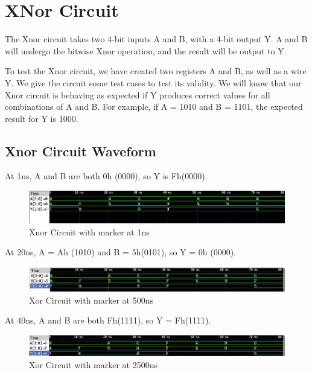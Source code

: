 \documentclass[12pt]{article}
\begin{document}
 \section{XNor Circuit}
 The Xnor circuit takes two 4-bit inputs A and B, with a 4-bit output Y. A and B will undergo the bitwise Xnor operation, and the result will be output to Y.
  
 
 To test the Xnor circuit, we have created two registers A and B, as well as a wire Y. We give the circuit some test cases to test its validity. We will know that our Xnor circuit is behaving as expected if Y produces correct values for all combinations of A and B. For example, if A = 1010 and B = 1101, the expected result for Y is 1000.
 
 
 \subsection{Xnor Circuit Waveform} 
 
 At 1ns, A and B are both 0h (0000), so Y is Fh(0000).
 \begin{figure}[H]
  \centering
  \includegraphics[width = 1.0\textwidth]{Xnor/XNOR-0ns.png}
  \caption{Xnor Circuit with marker at 1ns}
  \label{fig:enter-label} 
 \end{figure} 
 
 At 20ns, A = Ah (1010) and B = 5h(0101), so Y = 0h (0000).
  \begin{figure}[H]
  \centering 
 \includegraphics[width = 1.0\textwidth]{Xnor/XNOR-20ns.png}
  \caption{Xor Circuit with marker at 500ns}
  \label{fig:enter-label}
  \end{figure}
 
 At 40ns, A and B are both Fh(1111), so Y = Fh(1111).
  \begin{figure}[H]
  \centering 
 \includegraphics[width = 1.0\textwidth]{Xnor/XNOR-40ns.png}
  \caption{Xor Circuit with marker at 2500ns}
  \label{fig:enter-label}
  \end{figure}
 
\end{document}
